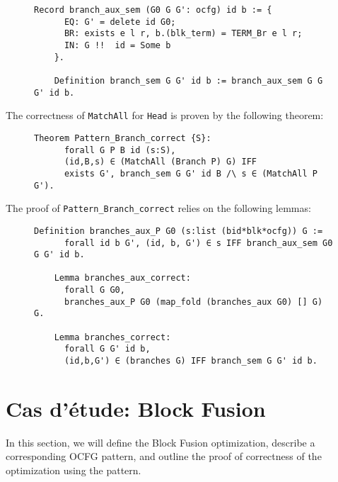 \documentclass[11pt]{article}
\newcommand{\inlinecoq}[1]{\mbox{\lstinline[style=customcoq,columns=fixed,basewidth=.48em]{#1}}}
\newcommand{\ilc}[1]{\inlinecoq{#1}}
\begin{document}
\begin{figure}[H]
  \label{fig:sem_branch_def}
  \begin{lstlisting}[style=customcoq,basicstyle=\small\ttfamily]
    Record branch_aux_sem (G0 G G': ocfg) id b := {
      EQ: G' = delete id G0;
      BR: exists e l r, b.(blk_term) = TERM_Br e l r;
      IN: G !!  id = Some b
    }.

    Definition branch_sem G G' id b := branch_aux_sem G G G' id b.
  \end{lstlisting}
\end{figure}

The correctness of \ilc{MatchAll} for \ilc{Head} is proven by the following theorem:

\begin{figure}[H]
  \label{fig:sem_branch}
  \begin{lstlisting}[style=customcoq,basicstyle=\small\ttfamily]
    Theorem Pattern_Branch_correct {S}:
      forall G P B id (s:S),
      (id,B,s) ∈ (MatchAll (Branch P) G) IFF
      exists G', branch_sem G G' id B /\ s ∈ (MatchAll P G').
  \end{lstlisting}
\end{figure}

The proof of \ilc{Pattern_Branch_correct} relies on the following lemmas:

\begin{figure}[H]
  \label{fig:block_cor}
  \begin{lstlisting}[style=customcoq,basicstyle=\small\ttfamily]
    Definition branches_aux_P G0 (s:list (bid*blk*ocfg)) G :=
      forall id b G', (id, b, G') ∈ s IFF branch_aux_sem G0 G G' id b.

    Lemma branches_aux_correct:
      forall G G0,
      branches_aux_P G0 (map_fold (branches_aux G0) [] G) G.

    Lemma branches_correct:
      forall G G' id b, 
      (id,b,G') ∈ (branches G) IFF branch_sem G G' id b.
  \end{lstlisting}
\end{figure}

\section{Cas d'étude: Block Fusion}
\label{sec:case}

In this section, we will define the Block Fusion optimization, describe a corresponding OCFG pattern,
and outline the proof of correctness of the optimization using the pattern.
\end{document}
